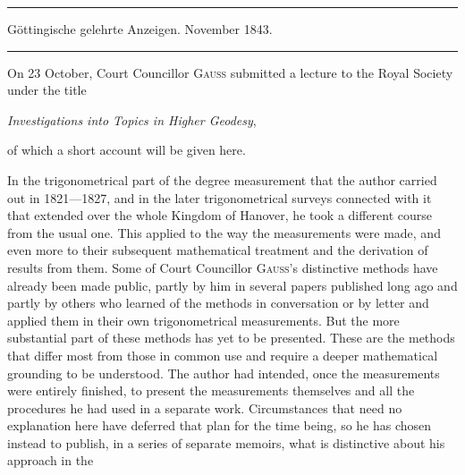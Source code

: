 \begin{center}
\rule{.85\textwidth}{.3pt}\par
Göttingische gelehrte Anzeigen. November 1843.\par
\rule{.85\textwidth}{.3pt}
\end{center}
\hspace*{\parindent}On 23 October, Court Councillor \textsc{Gauss} submitted a lecture to the Royal Society under the title
\begin{center}\textit{Investigations into Topics in Higher Geodesy},\end{center}
\noindent of which a short account will be given here.

In the trigonometrical part of the degree measurement that the author carried out in 1821---1827, and in the later trigonometrical surveys connected with it that extended over the whole Kingdom of Hanover, he took a different course from the usual one. This applied to the way the measurements were made, and even more to their subsequent mathematical treatment and the derivation of results from them. Some of Court Councillor \textsc{Gauss}'s distinctive methods have already been made public, partly by him in several papers published long ago and partly by others who learned of the methods in conversation or by letter and applied them in their own trigonometrical measurements. But the more substantial part of these methods has yet to be presented. These are the methods that differ most from those in common use and require a deeper mathematical grounding to be understood. The author had intended, once the measurements were entirely finished, to present the measurements themselves and all the procedures he had used in a separate work. Circumstances that need no explanation here have deferred that plan for the time being, so he has chosen instead to publish, in a series of separate memoirs, what is distinctive about his approach in the %
